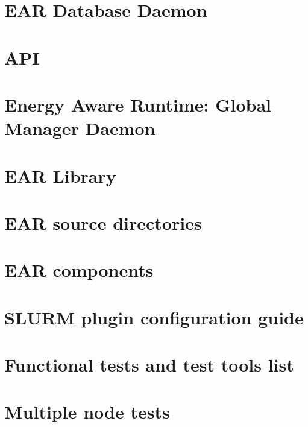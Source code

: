 \documentclass[twoside]{book}
\newcommand{\+}{\discretionary{\mbox{\scriptsize$\hookleftarrow$}}{}{}}
\begin{document}
\chapter{E\+AR Database Daemon}
\label{md_src_database_cache_README}
\hypertarget{md_src_database_cache_README}{}

\chapter{A\+PI}
\label{md_src_global_manager_README.dev}
\hypertarget{md_src_global_manager_README.dev}{}

\chapter{Energy Aware Runtime\+: Global Manager Daemon}
\label{md_src_global_manager_README}
\hypertarget{md_src_global_manager_README}{}

\chapter{E\+AR Library}
\label{md_src_library_README}
\hypertarget{md_src_library_README}{}

\chapter{E\+AR source directories}
\label{md_src_README.dev}
\hypertarget{md_src_README.dev}{}

\chapter{E\+AR components}
\label{md_src_README}
\hypertarget{md_src_README}{}

\chapter{S\+L\+U\+RM plugin configuration guide}
\label{md_src_slurm_plugin_README}
\hypertarget{md_src_slurm_plugin_README}{}

\chapter{Functional tests and test tools list}
\label{md_src_tests_functionals_README}
\hypertarget{md_src_tests_functionals_README}{}

\chapter{Multiple node tests}
\label{md_src_tests_plugin_multiple_node_README}
\hypertarget{md_src_tests_plugin_multiple_node_README}{}

\end{document}

